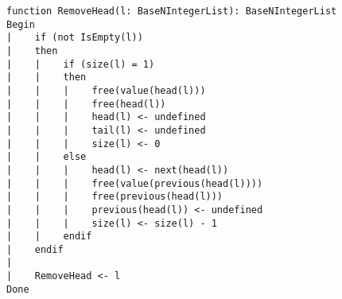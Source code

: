 \begin{lstlisting}[breaklines]
function RemoveHead(l: BaseNIntegerList): BaseNIntegerList
Begin
|    if (not IsEmpty(l))
|    then
|    |    if (size(l) = 1)
|    |    then
|    |    |    free(value(head(l)))
|    |    |    free(head(l))
|    |    |    head(l) <- undefined
|    |    |    tail(l) <- undefined
|    |    |    size(l) <- 0
|    |    else
|    |    |    head(l) <- next(head(l))
|    |    |    free(value(previous(head(l))))
|    |    |    free(previous(head(l)))
|    |    |    previous(head(l)) <- undefined
|    |    |    size(l) <- size(l) - 1
|    |    endif
|    endif
|
|    RemoveHead <- l
Done
\end{lstlisting}
